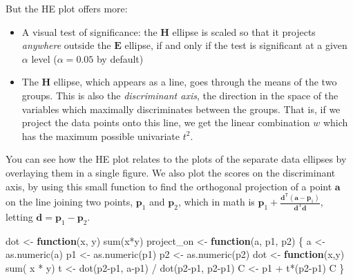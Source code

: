 \documentclass[
  letterpaper,
  10pt,
  krantz2]{krantz}
\makeatletter
\newenvironment{Shaded}{\begin{snugshade}}{\end{snugshade}}
\newcommand{\ControlFlowTok}[1]{\textcolor[rgb]{0.00,0.23,0.31}{\textbf{#1}}}
\newcommand{\FunctionTok}[1]{\textcolor[rgb]{0.28,0.35,0.67}{#1}}
\newcommand{\NormalTok}[1]{\textcolor[rgb]{0.00,0.23,0.31}{#1}}
\newcommand{\OtherTok}[1]{\textcolor[rgb]{0.00,0.23,0.31}{#1}}
\newcommand{\SpecialCharTok}[1]{\textcolor[rgb]{0.37,0.37,0.37}{#1}}
\newenvironment{kframe}{%
  \medskip{}
  \setlength{\fboxsep}{.8em}
  \def\at@end@of@kframe{}%
  \ifinner\ifhmode%
  \def\at@end@of@kframe{\end{minipage}}%
  \begin{minipage}{\columnwidth}%
  \fi\fi%
  \def\FrameCommand##1{\hskip\@totalleftmargin \hskip-\fboxsep
  \colorbox{shadecolor}{##1}\hskip-\fboxsep
      \hskip-\linewidth \hskip-\@totalleftmargin \hskip\columnwidth}%
  \MakeFramed {\advance\hsize-\width
    \@totalleftmargin\z@ \linewidth\hsize
    \@setminipage}}%
{\par\unskip\endMakeFramed%
  \at@end@of@kframe}
\renewenvironment{Shaded}{\begin{kframe}}{\end{kframe}}
\makeatother
\begin{document}
But the HE plot offers more:

\begin{itemize}
\item
  A visual test of significance: the \(\mathbf{H}\) ellipse is scaled so
  that it projects \emph{anywhere} outside the \(\mathbf{E}\) ellipse,
  if and only if the test is significant at a given \(\alpha\) level
  (\(\alpha = 0.05\) by default)
\item
  The \(\mathbf{H}\) ellipse, which appears as a line, goes through the
  means of the two groups. This is also the \emph{discriminant axis},
  the direction in the space of the variables which maximally
  discriminates between the groups. That is, if we project the data
  points onto this line, we get the linear combination \(w\) which has
  the maximum possible univariate \(t^2\).
\end{itemize}

You can see how the HE plot relates to the plots of the separate data
ellipses by overlaying them in a single figure. We also plot the scores
on the discriminant axis, by using this small function to find the
orthogonal projection of a point \(\mathbf{a}\) on the line joining two
points, \(\mathbf{p}_1\) and \(\mathbf{p}_2\), which in math is
\(\mathbf{p}_1 + \frac{\mathbf{d}^\mathsf{T} (\mathbf{a} - \mathbf{p}_1)} {\mathbf{d}^\mathsf{T} \mathbf{d}}\),
letting \(\mathbf{d} = \mathbf{p}_1 - \mathbf{p}_2\).

\begin{Shaded}
\begin{Highlighting}[]
\NormalTok{dot }\OtherTok{\textless{}{-}} \ControlFlowTok{function}\NormalTok{(x, y) }\FunctionTok{sum}\NormalTok{(x}\SpecialCharTok{*}\NormalTok{y)}
\NormalTok{project\_on }\OtherTok{\textless{}{-}} \ControlFlowTok{function}\NormalTok{(a, p1, p2) \{}
\NormalTok{    a }\OtherTok{\textless{}{-}} \FunctionTok{as.numeric}\NormalTok{(a)}
\NormalTok{    p1 }\OtherTok{\textless{}{-}} \FunctionTok{as.numeric}\NormalTok{(p1)}
\NormalTok{    p2 }\OtherTok{\textless{}{-}} \FunctionTok{as.numeric}\NormalTok{(p2)}
\NormalTok{    dot }\OtherTok{\textless{}{-}} \ControlFlowTok{function}\NormalTok{(x,y) }\FunctionTok{sum}\NormalTok{( x }\SpecialCharTok{*}\NormalTok{ y)    }
\NormalTok{    t }\OtherTok{\textless{}{-}} \FunctionTok{dot}\NormalTok{(p2}\SpecialCharTok{{-}}\NormalTok{p1, a}\SpecialCharTok{{-}}\NormalTok{p1) }\SpecialCharTok{/} \FunctionTok{dot}\NormalTok{(p2}\SpecialCharTok{{-}}\NormalTok{p1, p2}\SpecialCharTok{{-}}\NormalTok{p1)}
\NormalTok{    C }\OtherTok{\textless{}{-}}\NormalTok{ p1 }\SpecialCharTok{+}\NormalTok{ t}\SpecialCharTok{*}\NormalTok{(p2}\SpecialCharTok{{-}}\NormalTok{p1)}
\NormalTok{    C}
\NormalTok{\}}
\end{Highlighting}
\end{Shaded}
\end{document}
